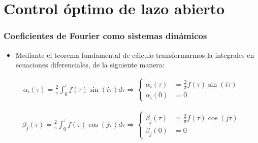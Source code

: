 \section{Control óptimo de lazo abierto}
\begin{frame}
    \frametitle{Coeficientes de Fourier como sistemas dinámicos}
    \begin{itemize}
        \item Mediante el teorema fundamental de cálculo transformarmos la integrales en ecuaciones diferenciales, de la siguiente manera:
    \end{itemize}
    \begin{gather}
        \alpha_i(\tau) = \frac{2}{\pi}\int_0^\tau f(\tau) \sin(i\tau)d\tau 
        \Rightarrow
        \begin{cases} \label{ode}
            \dot{\alpha_i}(\tau) & = \frac{2}{\pi}f(\tau)\sin(i\tau) \\  
            \alpha_i(0) & = 0       
        \end{cases}
    \end{gather}
    
    \begin{gather}
        \beta_j(\tau) = \frac{2}{\pi}\int_0^\tau f(\tau) \cos(j\tau)d\tau 
        \Rightarrow
        \begin{cases} \label{ode}
            \dot{\beta}_j(\tau) & = \frac{2}{\pi}f(\tau)\cos(j\tau) \\  
            \beta_j(0) & = 0       
        \end{cases}
    \end{gather}

\end{frame}
